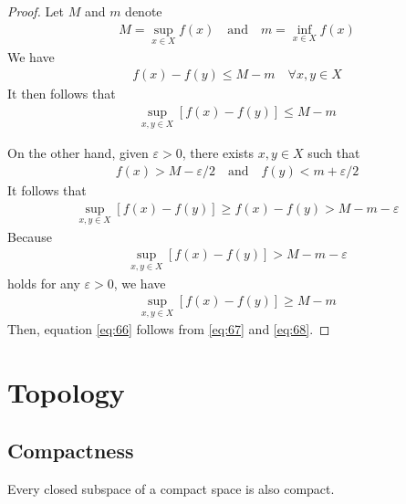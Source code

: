 \documentclass[thmcnt=section, 12pt]{my-elegantbook}
\begin{document}
\begin{proof}
    Let $M$ and $m$ denote
    \begin{align*}
        M = \sup_{x \in X} f(x)
        \quad\text{and}\quad
        m = \inf_{x \in X} f(x)
    \end{align*}
    We have
    \begin{align*}
        f(x) - f(y) \leq M - m
        \quad \forall x,y \in X
    \end{align*}
    It then follows that
    \begin{align}
        \sup_{x,y \in X} [f(x) - f(y)]
        \leq M - m
        \label{eq:67}
    \end{align}

    On the other hand, given $\varepsilon > 0$, there exists $x, y \in X$ such that
    \begin{align}
        f(x) > M - \varepsilon / 2
        \quad \text{and} \quad
        f(y) < m + \varepsilon / 2
    \end{align}
    It follows that
    \begin{align*}
        \sup_{x,y \in X} [f(x) - f(y)]
        \geq f(x) - f(y)
        > M - m - \varepsilon
    \end{align*}
    Because
    \begin{align*}
        \sup_{x,y \in X} [f(x) - f(y)]
        > M - m - \varepsilon
    \end{align*}
    holds for any $\varepsilon > 0$, we have
    \begin{align}
        \sup_{x,y \in X} [f(x) - f(y)]
        \geq M - m
        \label{eq:68}
    \end{align}
    Then, equation \eqref{eq:66} follows from \eqref{eq:67} and \eqref{eq:68}.
\end{proof}


\chapter{Topology}


\section{Compactness}


\begin{theorem} \label{thm:90}
    Every closed subspace of a compact space is also compact.
\end{theorem}
\end{document}
